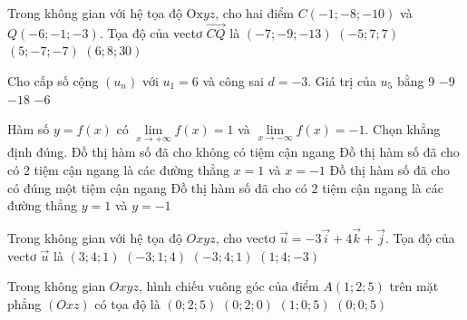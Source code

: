 \begin{ex}%
Trong không gian với hệ tọa độ $\text{Ox}yz$, cho hai điểm $C\left(-1;-8;-10\right)$ và $Q\left(-6;-1;-3\right)$. Tọa độ của vectơ $\overrightarrow{CQ}$ là
\choice
{$\left(-7;-9;-13\right)$}
{\True $\left(-5;7;7\right)$}
{$\left(5;-7;-7\right)$}
{$\left(6;8;30\right)$}
\end{ex}

\begin{ex}%
Cho cấp số cộng $\left(u_n\right)$ với $u_1=6$ và công sai $d=-3$. Giá trị của $u_5$ bằng 
\choice
{$9$}
{$-9$}
{$-18$}
{\True $-6$}
\end{ex}

\begin{ex}%
Hàm số $y=f(x)$ có $\lim\limits_{x\to+\infty}f(x)=1$ và $\lim\limits_{x\to-\infty}f(x)=-1$. Chọn khẳng định đúng.
\choice
{Đồ thị hàm số đã cho không có tiệm cận ngang}
{Đồ thị hàm số đã cho có $2$ tiệm cận ngang là các đường thẳng $x=1$ và $x=-1$}
{Đồ thị hàm số đã cho có đúng một tiệm cận ngang}
{\True Đồ thị hàm số đã cho có $2$ tiệm cận ngang là các đường thẳng $y=1$ và $y=-1$}
\end{ex}

\begin{ex}%
Trong không gian với hệ tọa độ $Oxyz$, cho vectơ $\vec{u}=-3\vec{i}+4\vec{k}+\vec{j}$. Tọa độ của vectơ $\vec{u}$ là
\choice
{$(3; 4; 1)$}
{\True $(-3; 1; 4)$}
{$(-3; 4; 1)$}
{$(1; 4;-3)$}
\end{ex}

\begin{ex}%
Trong không gian $Oxyz$, hình chiếu vuông góc của điểm $A\left(1;2;5\right)$ trên mặt phẳng $\left(Oxz\right)$ có tọa độ là 
\choice
{$\left(0;2;5\right)$}
{$\left(0;2;0\right)$}
{\True $\left(1;0;5\right)$}
{$\left(0;0;5\right)$}
\end{ex}

